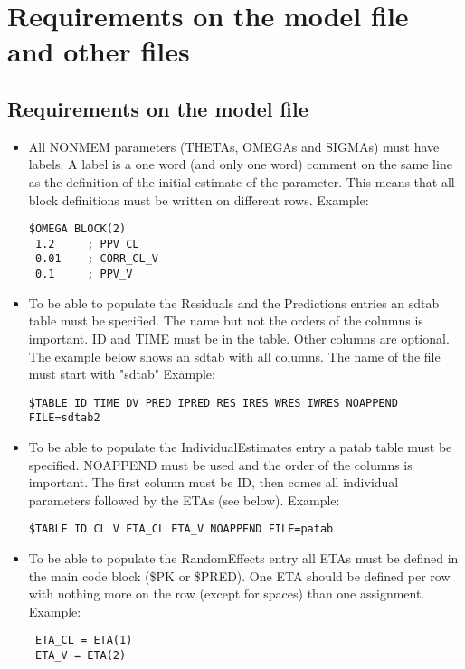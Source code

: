 \section{Requirements on the model file and other files}

\subsection{Requirements on the model file}
\begin{itemize}
    \item All NONMEM parameters (THETAs, OMEGAs and SIGMAs) must have labels. A label is a one word (and only one word) comment on the same line as the definition of the initial estimate of the parameter. This means that all block definitions must be written on different rows. Example:
        \begin{verbatim}
$OMEGA BLOCK(2)
 1.2     ; PPV_CL
 0.01    ; CORR_CL_V
 0.1     ; PPV_V
        \end{verbatim}
    \item To be able to populate the Residuals and the Predictions entries an sdtab table must be specified. The name but not the orders of the columns is important. ID and TIME must be in the table. Other columns are optional. The example below shows an sdtab with all columns. The name of the file must start with "sdtab" Example:
        \begin{verbatim}
$TABLE ID TIME DV PRED IPRED RES IRES WRES IWRES NOAPPEND FILE=sdtab2
        \end{verbatim}
    \item To be able to populate the IndividualEstimates entry a patab table must be specified. NOAPPEND must be used and the order of the columns is important. The first column must be ID, then comes all individual parameters followed by the ETAs (see below). Example:
        \begin{verbatim}
$TABLE ID CL V ETA_CL ETA_V NOAPPEND FILE=patab
        \end{verbatim}
    \item To be able to populate the RandomEffects entry all ETAs must be defined in the main code block (\$PK or \$PRED). One ETA should be defined per row with nothing more on the row (except for spaces) than one assignment. Example:
        \begin{verbatim}
 ETA_CL = ETA(1)
 ETA_V = ETA(2)
        \end{verbatim}
\end{itemize}


